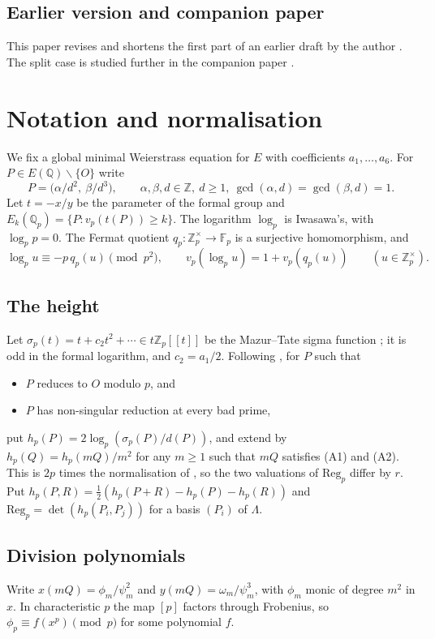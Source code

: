\documentclass[11pt,a4paper]{amsart}
\newcommand{\Q}{\mathbb{Q}}
\newcommand{\Z}{\mathbb{Z}}
\newcommand{\Qp}{\mathbb{Q}_p}
\newcommand{\Zp}{\mathbb{Z}_p}
\newcommand{\Fp}{\mathbb{F}_p}
\newcommand{\Reg}{\mathrm{Reg}}
\newcommand{\Lam}{\Lambda}
\newcommand{\qp}{q_p}
\theoremstyle{plain}
\theoremstyle{definition}
\theoremstyle{remark}
\begin{document}
\subsection*{Earlier version and companion paper}
This paper revises and shortens the first part of an earlier draft by the author \cite{Draft}. The split case is studied further in the companion paper \cite{Comp}.

\section{Notation and normalisation}\label{sec:notation}

We fix a global minimal Weierstrass equation for $E$ with coefficients $a_1,\dots,a_6$. For $P\in E(\Q)\smallsetminus\{O\}$ write
\[
P=\bigl(\alpha/d^2,\ \beta/d^3\bigr),\qquad \alpha,\beta,d\in\Z,\ d\ge1,\ \gcd(\alpha,d)=\gcd(\beta,d)=1 .
\]
Let $t=-x/y$ be the parameter of the formal group and $E_k(\Qp)=\{P: v_p(t(P))\ge k\}$. The logarithm $\log_p$ is Iwasawa's, with $\log_p p=0$. The Fermat quotient $\qp\colon\Zp^\times\to\Fp$ is a surjective homomorphism, and
\begin{equation}\label{eq:log-fermat}
\log_p u\equiv-p\,\qp(u)\pmod{p^2},\qquad v_p(\log_pu)=1+v_p(\qp(u))\qquad(u\in\Zp^\times).
\end{equation}

\subsection*{The height}
Let $\sigma_p(t)=t+c_2t^2+\cdots\in t\Zp[[t]]$ be the Mazur--Tate sigma function \cite{MT91}; it is odd in the formal logarithm, and $c_2=a_1/2$. Following \cite[\S2.2]{Har}, for $P$ such that
\begin{itemize}
\item[(A1)] $P$ reduces to $O$ modulo $p$, and
\item[(A2)] $P$ has non-singular reduction at every bad prime,
\end{itemize}
put $h_p(P)=2\log_p(\sigma_p(P)/d(P))$, and extend by $h_p(Q)=h_p(mQ)/m^2$ for any $m\ge1$ such that $mQ$ satisfies \textup{(A1)} and \textup{(A2)}. This is $2p$ times the normalisation of \cite{MST}, so the two valuations of $\Reg_p$ differ by $r$. Put $h_p(P,R)=\frac12(h_p(P+R)-h_p(P)-h_p(R))$ and $\Reg_p=\det(h_p(P_i,P_j))$ for a basis $(P_i)$ of $\Lam$.

\subsection*{Division polynomials}
Write $x(mQ)=\phi_m/\psi_m^2$ and $y(mQ)=\omega_m/\psi_m^3$, with $\phi_m$ monic of degree $m^2$ in $x$. In characteristic $p$ the map $[p]$ factors through Frobenius, so $\phi_p\equiv f(x^p)\pmod p$ for some polynomial $f$.
\end{document}
